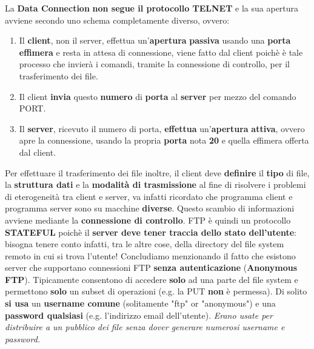 \documentclass[11pt,a4paper,oneside]{book}
\theoremstyle{definition}
\begin{document}
La \textbf{Data Connection} \textbf{non segue il protocollo TELNET} e la sua apertura avviene secondo uno schema completamente diverso, ovvero:
\begin{enumerate}
	\item Il \textbf{client}, non il server, effettua un'\textbf{apertura} \textbf{passiva} usando una \textbf{porta effimera} e resta in attesa di connessione, viene fatto dal client poichè è tale processo che invierà i comandi, tramite la connessione di controllo, per il trasferimento dei file.
	\item Il client \textbf{invia} questo \textbf{numero} di \textbf{porta} al \textbf{server} per mezzo del comando PORT.
	\item Il \textbf{server}, ricevuto il numero di porta, \textbf{effettua} un'\textbf{apertura} \textbf{attiva}, ovvero apre la connessione, usando la propria \textbf{porta} nota \textbf{20} e quella effimera offerta dal client.
\end{enumerate}
Per effettuare il trasferimento dei file inoltre, il client deve \textbf{definire} il \textbf{tipo}
di file, la \textbf{struttura dati} e la \textbf{modalità di trasmissione} al fine di
risolvere i problemi di eterogeneità tra client e server, va infatti ricordato che programma client e programma server sono su macchine \textbf{diverse}. Questo scambio di informazioni avviene mediante la \textbf{connessione di controllo}.\newline\newline
FTP è quindi un protocollo \textbf{STATEFUL} poichè il \textbf{server deve tener traccia dello stato dell’utente}: bisogna tenere conto infatti, tra le altre cose, della directory del file system remoto in cui si trova l'utente!\newline\newline
Concludiamo menzionando il fatto che esistono server che supportano connessioni FTP \textbf{senza autenticazione} (\textbf{Anonymous FTP}).  Tipicamente consentono di accedere \textbf{solo} ad una parte del file system e permettono \textbf{solo} un subset di operazioni (e.g. la PUT \textbf{non} è permessa). Di solito \textbf{si usa} un \textbf{username comune} (solitamente "ftp" or "anonymous") e una \textbf{password qualsiasi} (e.g. l'indirizzo email dell'utente).\textit{ Erano usate per distribuire a un pubblico dei file senza dover generare numerosi username e password.}
\end{document}
